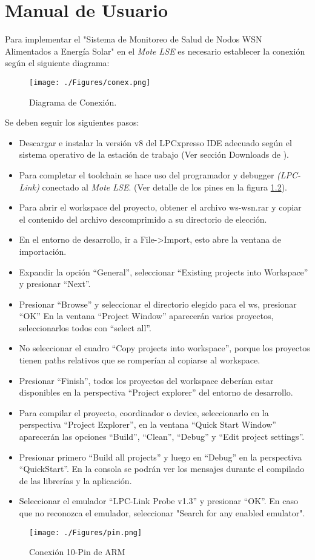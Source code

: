 
\chapter{Manual de Usuario} %

\label{AppendixA} %
Para implementar el "Sistema de Monitoreo de Salud de Nodos WSN Alimentados a Energía Solar" en el \textit{Mote LSE} es necesario establecer la conexión según el siguiente diagrama:
\vspace{10px}
\begin{figure}[h!]
	\centering
    \texttt{[image: ./Figures/conex.png]}
    	\caption{Diagrama de Conexión.}
	\label{fig:conex}
\end{figure}

Se deben seguir los siguientes pasos:
\begin{itemize}
	\item Descargar e instalar la versión v8 del LPCxpresso IDE adecuado según el sistema operativo de la estación de trabajo (Ver sección Downloads de \citep{IDE}).
	\item Para completar el toolchain se hace uso del programador y debugger \textit{(LPC-Link)} conectado al \textit{Mote LSE}. (Ver detalle de los pines en la figura \ref{fig:10pin}).
	\item Para abrir el workspace del proyecto, obtener el archivo ws-wsn.rar y copiar el contenido del archivo descomprimido a su directorio de elección.
	\item En el entorno de desarrollo, ir a File->Import, esto abre la ventana de importación.
	\item Expandir la opción “General”, seleccionar “Existing projects into Workspace” y presionar “Next”.
	\item Presionar “Browse” y seleccionar el directorio elegido para el ws, presionar “OK” En la ventana “Project Window” aparecerán varios proyectos, seleccionarlos todos con “select all”.
	\item No seleccionar el cuadro “Copy projects into workspace”, porque los proyectos tienen paths relativos que se romperían al copiarse al workspace.
	\item Presionar “Finish”, todos los proyectos del workspace deberían estar disponibles en la perspectiva “Project explorer” del entorno de desarrollo.
	\item Para compilar el proyecto, coordinador o device, seleccionarlo en la perspectiva “Project Explorer”, en la ventana “Quick Start Window” aparecerán las opciones “Build”, “Clean”, “Debug” y “Edit project settings”.
	\item Presionar primero “Build all projects” y luego en “Debug” en la perspectiva “QuickStart”. En la consola se podrán ver los mensajes durante el compilado de las librerías y la aplicación.
	\item Seleccionar el emulador “LPC-Link Probe v1.3” y presionar “OK”. En caso que no reconozca el emulador, seleccionar "Search for any enabled emulator".
	\end{itemize}

\begin{figure}[h!]
	\centering
    \texttt{[image: ./Figures/pin.png]}
    	\caption{Conexión 10-Pin de ARM}
	\label{fig:10pin}
\end{figure}

